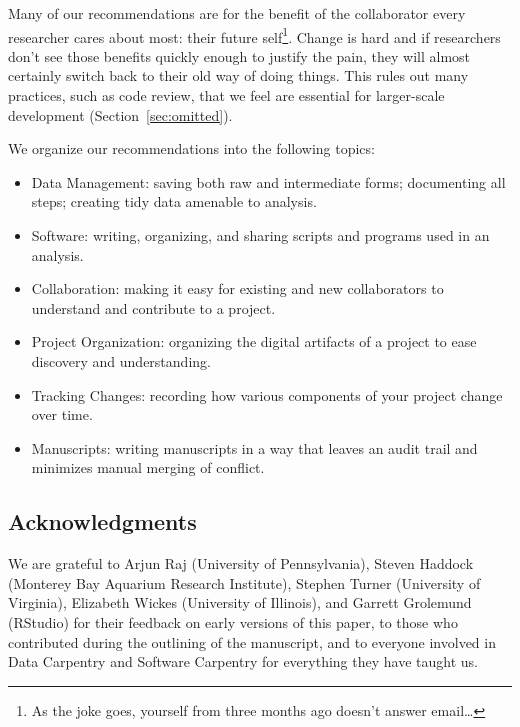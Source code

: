 \documentclass[10pt,letterpaper]{article}
\begin{document}
Many of our recommendations are for the benefit of the collaborator
every researcher cares about most: their future self\footnote{As the
joke goes, yourself from three months ago doesn't answer
email{\ldots}}. Change is hard and if researchers don't see those benefits
quickly enough to justify the pain,
they will almost certainly switch back to their old way
of doing things.  This rules out many practices, such as code review,
that we feel are essential for larger-scale development
(Section~\ref{sec:omitted}).

We organize our recommendations into the following topics:

\begin{itemize}

\item Data Management:
  saving both raw and intermediate forms; documenting all steps; creating tidy data amenable to analysis.

\item Software:
  writing, organizing, and sharing scripts and programs used in an analysis.

\item Collaboration:
  making it easy for existing and new collaborators to understand and contribute to a project.

\item Project Organization:
  organizing the digital artifacts of a project to ease discovery and understanding.

\item Tracking Changes:
  recording how various components of your project change over time.

\item Manuscripts:
  writing manuscripts in a way that leaves an audit trail and minimizes manual merging of conflict.

\end{itemize}

\subsection*{Acknowledgments}

We are grateful to Arjun Raj (University of Pennsylvania), Steven
Haddock (Monterey Bay Aquarium Research Institute), Stephen Turner
(University of Virginia), Elizabeth Wickes (University of Illinois),
and Garrett Grolemund (RStudio) for their feedback on early versions
of this paper, to those who contributed during the outlining of the
manuscript, and to everyone involved in Data Carpentry and Software
Carpentry for everything they have taught us.
\end{document}
